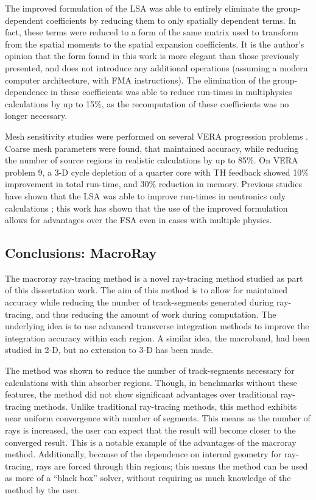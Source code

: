 {{{      The improved formulation of the \ac{LSA} was able to entirely eliminate the group-dependent coefficients by reducing them to only spatially dependent terms.
      In fact, these terms were reduced to a form of the same matrix used to transform from the spatial moments to the spatial expansion coefficients.
      It is the author's opinion that the form found in this work is more elegant than those previously presented, and does not introduce any additional operations (assuming a modern computer architecture, with \acf{FMA} instructions).
      The elimination of the group-dependence in these coefficients was able to reduce run-times in multiphysics calculations by up to 15\%, as the recomputation of these coefficients was no longer necessary.

      Mesh sensitivity studies were performed on several \ac{VERA} progression problems \cite{VERAProblems}.
      Coarse mesh parameters were found, that maintained accuracy, while reducing the number of source regions in realistic calculations by up to 85\%.
      On \ac{VERA} problem 9, a 3-D cycle depletion of a quarter core with \ac{TH} feedback showed 10\% improvement in total run-time, and 30\% reduction in memory.
      Previous studies have shown that the \ac{LSA} was able to improve run-times in neutronics only calculations \cite{Ferrer2016,Gunow2018};
      this work has shown that the use of the improved formulation allows for advantages over the \ac{FSA} even in cases with multiple physics.
    }

    \subsection{Conclusions: MacroRay}{\label{ssec:Conclusions:MacroRay}
      The macroray ray-tracing method is a novel ray-tracing method studied as part of this dissertation work.
      The aim of this method is to allow for maintained accuracy while reducing the number of track-segments generated during ray-tracing, and thus reducing the amount of work during computation.
      The underlying idea is to use advanced transverse integration methods to improve the integration accuracy within each region.
      A similar idea, the macroband, had been studied in 2-D, but no extension to 3-D has been made.

      The method was shown to reduce the number of track-segments necessary for calculations with thin absorber regions.
      Though, in benchmarks without these features, the method did not show significant advantages over traditional ray-tracing methods.
      Unlike traditional ray-tracing methods, this method exhibits near uniform convergence with number of segments.
      This means as the number of rays is increased, the user can expect that the result will become closer to the converged result.
      This is a notable example of the advantages of the macroray method.
      Additionally, because of the dependence on internal geometry for ray-tracing, rays are forced through thin regions;
        this means the method can be used as more of a ``black box'' solver, without requiring as much knowledge of the method by the user.
    }
  }

}

